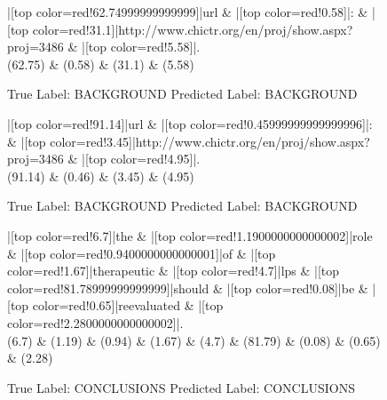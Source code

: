 \documentclass[a4paper, landscape]{article}
\begin{document}
\clearpage
\begin{figure}
\begin{center}
\begin{dependency}
\begin{deptext}
|[top color=red!62.74999999999999]|url \& |[top color=red!0.58]|: \& |[top color=red!31.1]|http://www.chictr.org/en/proj/show.aspx?proj=3486 \& |[top color=red!5.58]|.\\
(62.75) \& (0.58) \& (31.1) \& (5.58)\\
\end{deptext}
\end{dependency}
\end{center}
\caption{True Label: BACKGROUND Predicted Label: BACKGROUND}
\end{figure}
\clearpage
\begin{figure}
\begin{center}
\begin{dependency}
\begin{deptext}
|[top color=red!91.14]|url \& |[top color=red!0.45999999999999996]|: \& |[top color=red!3.45]|http://www.chictr.org/en/proj/show.aspx?proj=3486 \& |[top color=red!4.95]|.\\
(91.14) \& (0.46) \& (3.45) \& (4.95)\\
\end{deptext}
\end{dependency}
\end{center}
\caption{True Label: BACKGROUND Predicted Label: BACKGROUND}
\end{figure}
\clearpage
\begin{figure}
\begin{center}
\begin{dependency}
\begin{deptext}
|[top color=red!6.7]|the \& |[top color=red!1.1900000000000002]|role \& |[top color=red!0.9400000000000001]|of \& |[top color=red!1.67]|therapeutic \& |[top color=red!4.7]|lps \& |[top color=red!81.78999999999999]|should \& |[top color=red!0.08]|be \& |[top color=red!0.65]|reevaluated \& |[top color=red!2.2800000000000002]|.\\
(6.7) \& (1.19) \& (0.94) \& (1.67) \& (4.7) \& (81.79) \& (0.08) \& (0.65) \& (2.28)\\
\end{deptext}
\end{dependency}
\end{center}
\caption{True Label: CONCLUSIONS Predicted Label: CONCLUSIONS}
\end{figure}
\end{document}
